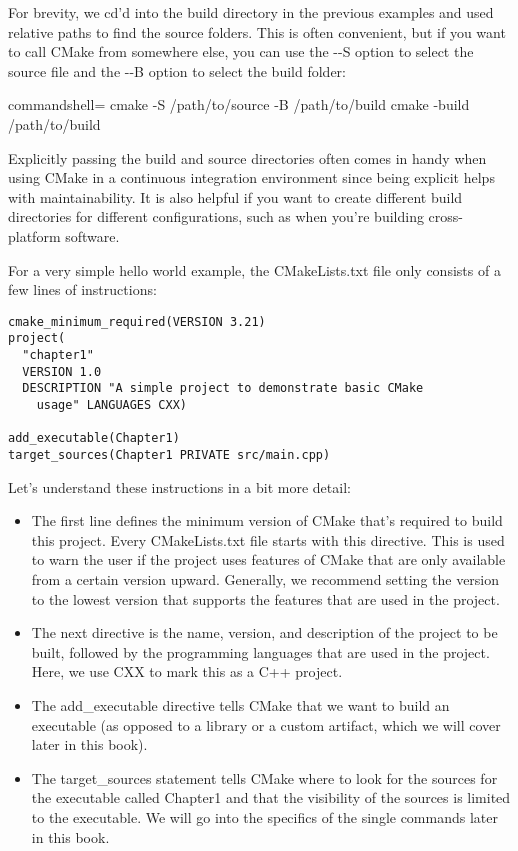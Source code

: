 For brevity, we cd'd into the build directory in the previous examples and used relative paths to find the source folders. This is often convenient, but if you want to call CMake from somewhere else, you can use the -{}-S option to select the source file and the -{}-B option to select the build folder:

\begin{tcblisting}{commandshell={}}
cmake -S /path/to/source -B /path/to/build
cmake -build /path/to/build
\end{tcblisting}

Explicitly passing the build and source directories often comes in handy when using CMake in a continuous integration environment since being explicit helps with maintainability. It is also helpful if you want to create different build directories for different configurations, such as when you're building cross-platform software.


For a very simple hello world example, the CMakeLists.txt file only consists of a few lines of instructions:

\begin{lstlisting}[style=styleCMake]
cmake_minimum_required(VERSION 3.21)
project(
  "chapter1"
  VERSION 1.0
  DESCRIPTION "A simple project to demonstrate basic CMake
    usage" LANGUAGES CXX)

add_executable(Chapter1)
target_sources(Chapter1 PRIVATE src/main.cpp)
\end{lstlisting}

Let's understand these instructions in a bit more detail:

\begin{itemize}
\item 
The first line defines the minimum version of CMake that's required to build this project. Every CMakeLists.txt file starts with this directive. This is used to warn the user if the project uses features of CMake that are only available from a certain version upward. Generally, we recommend setting the version to the lowest version that supports the features that are used in the project.

\item 
The next directive is the name, version, and   description of the project to be built, followed by the programming languages that are used in the project. Here, we use CXX to mark this as a C++ project.

\item 
The add\_executable directive tells CMake that we want to build an executable (as opposed to a library or a custom artifact, which we will cover later in this book).

\item 
The target\_sources statement tells CMake where to look for the sources for the executable called Chapter1 and that the visibility of the sources is limited to the executable. We will go into the specifics of the single commands later in this book.
\end{itemize}

